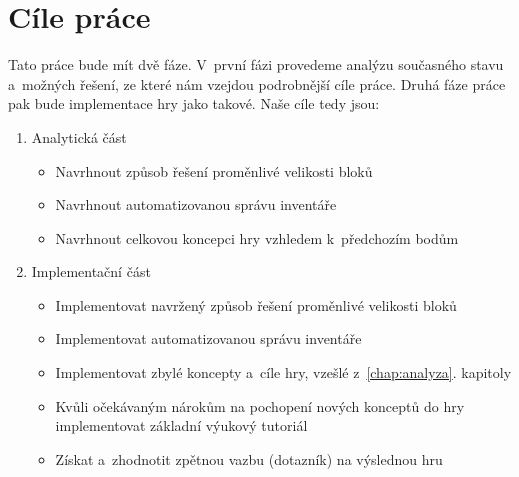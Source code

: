 \section{Cíle práce}
\label{sec:cile}
Tato práce bude mít dvě fáze. V~první fázi provedeme analýzu současného stavu a~možných řešení, ze které nám vzejdou podrobnější cíle práce. Druhá fáze práce pak bude implementace hry jako takové. Naše cíle tedy jsou:

\begin{enumerate}

 \item Analytická část
\begin{itemize}
	\item Navrhnout způsob řešení proměnlivé velikosti bloků
	\item Navrhnout automatizovanou správu inventáře
	\item Navrhnout celkovou koncepci hry vzhledem k~předchozím bodům
\end{itemize}

 \item Implementační část
\begin{itemize}
	\item Implementovat navržený způsob řešení proměnlivé velikosti bloků
	\item Implementovat automatizovanou správu inventáře
	\item Implementovat zbylé koncepty a~cíle hry, vzešlé z~\ref{chap:analyza}. kapitoly
	\item Kvůli očekávaným nárokům na pochopení nových konceptů do hry implementovat základní výukový tutoriál
	\item Získat a~zhodnotit zpětnou vazbu (dotazník) na výslednou hru
\end{itemize}

\end{enumerate}


